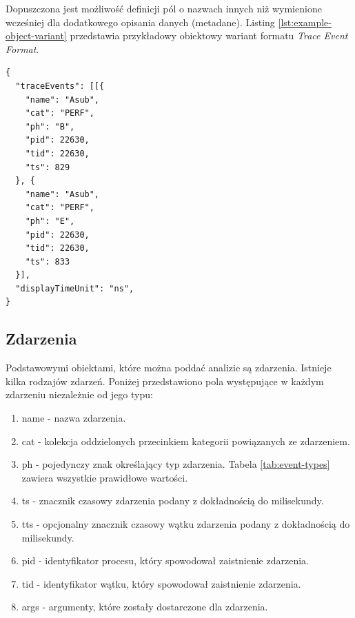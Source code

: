 \documentclass[polish, twoside, 12pt]{mwart}
\begin{document}
Dopuszczona jest możliwość definicji pól o nazwach innych niż wymienione wcześniej dla dodatkowego opisania danych (metadane). Listing \ref{lst:example-object-variant} przedstawia przykładowy obiektowy wariant formatu \emph{Trace Event Format}.

\begin{lstlisting}[caption=Przykładowy wariant obiektowy, label={lst:example-object-variant}]
{
  "traceEvents": [[{
    "name": "Asub",
    "cat": "PERF",
    "ph": "B",
    "pid": 22630,
    "tid": 22630,
    "ts": 829
  }, {
    "name": "Asub",
    "cat": "PERF",
    "ph": "E",
    "pid": 22630,
    "tid": 22630,
    "ts": 833
  }],
  "displayTimeUnit": "ns",
}
\end{lstlisting}

\subsection{Zdarzenia}

Podstawowymi obiektami, które można poddać analizie są zdarzenia. Istnieje kilka rodzajów zdarzeń. Poniżej przedstawiono pola występujące w każdym zdarzeniu niezależnie od jego typu:

\begin{enumerate}
  \item name - nazwa zdarzenia.
  \item cat - kolekcja oddzielonych przecinkiem kategorii powiązanych ze zdarzeniem.
  \item ph - pojedynczy znak określający typ zdarzenia. Tabela \ref{tab:event-types} zawiera wszystkie prawidłowe wartości.
  \item ts - znacznik czasowy zdarzenia podany z dokładnością do milisekundy.
  \item tts - opcjonalny znacznik czasowy wątku zdarzenia podany z dokładnością do milisekundy.
  \item pid - identyfikator procesu, który spowodował zaistnienie zdarzenia.
  \item tid - identyfikator wątku, który spowodował zaistnienie zdarzenia.
  \item args - argumenty, które zostały dostarczone dla zdarzenia.
\end{enumerate}
\end{document}
